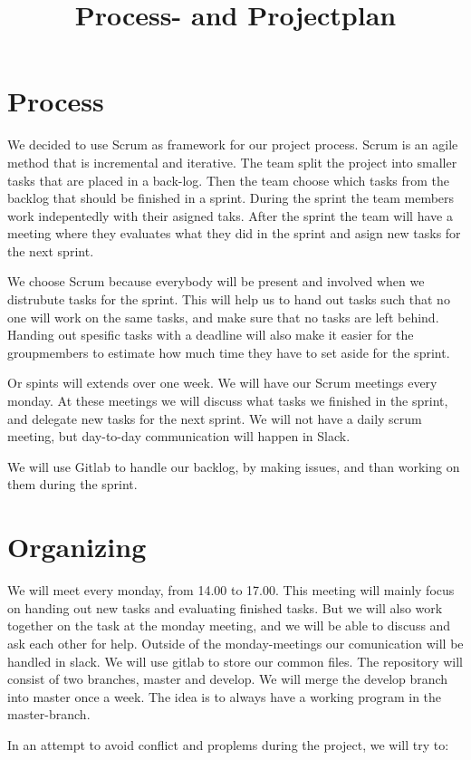 \documentclass[norsk]{article}
\title{Process- and Projectplan}
\begin{document}
	\maketitle
\section{Process}
We decided to use Scrum as framework for our project process. 
Scrum is an agile method that is incremental and iterative. The team split the project into smaller tasks that are placed in a back-log. Then the team choose which tasks from the backlog that should be finished in a sprint. During the sprint the team members work indepentedly with their asigned taks. After the sprint the team will have a meeting where they evaluates what they did in the sprint and asign new tasks for the next sprint. 

We choose Scrum because everybody will be present and involved when we distrubute tasks for the sprint. This will help us to hand out tasks such that no one will work on the same tasks, and make sure that no tasks are left behind. Handing out spesific tasks with a deadline will also make it easier for the groupmembers to estimate how much time they have to set aside for the sprint. 

Or spints will extends over one week. We will have our Scrum meetings every monday. At these meetings we will discuss what tasks we finished in the sprint, and delegate new tasks for the next sprint. We will not have a daily scrum meeting, but day-to-day communication will happen in Slack.

We will use Gitlab to handle our backlog, by making issues, and than working on them during the sprint. 
 
 \section{Organizing}
 We will meet every monday, from 14.00 to 17.00. This meeting will mainly focus on handing out new tasks and evaluating finished tasks. But we will also work together on the task at the monday meeting, and we will be able to discuss and ask each other for help.
 Outside of the monday-meetings our comunication will be handled in slack. 
 We will use gitlab to store our common files. The repository will consist of two branches, master and develop. We will merge the develop branch into master once a week. The idea is to always have a working program in the master-branch.
  
  In an attempt to avoid conflict and proplems during the project, we will try to:
  
\end{document}

